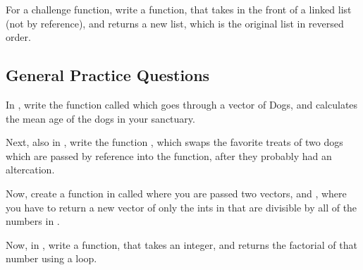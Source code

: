 \documentclass{tufte-handout}
\begin{document}
For a  challenge function, write a function,  that takes in the front of a linked list (not by reference), and returns a new list, which is the original list in reversed order.  

\subsection{General Practice Questions}

In , write the function called  which goes through a vector of Dogs, and calculates the mean age of the dogs in your sanctuary.

Next, also in , write the function , which swaps the favorite treats of two dogs which are passed by reference into the function, after they probably had an altercation.

Now, create a function in  called  where you are passed two vectors,  and , where you have to return a new vector of only the ints in  that are divisible by all of the numbers in .

Now, in , write a function,  that takes an integer, and returns the factorial of that number using a loop.  
\end{document}
